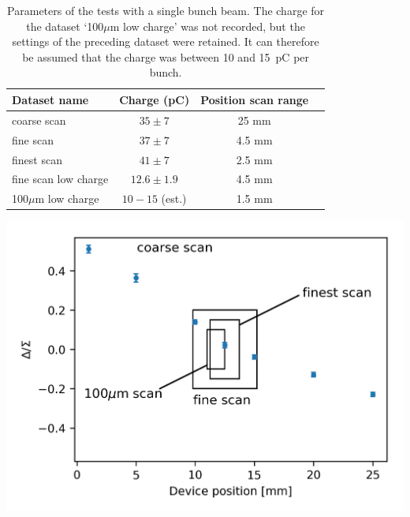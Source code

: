\begin{table}[!ht]
  \centering
    \begin{tabular}{l c c c}
    \toprule
    Dataset name & Charge (pC) & Position scan range  \\
    \midrule
    coarse scan  & $35\pm7$ & 25 mm\\
    fine scan    & $37\pm7$ & 4.5 mm\\
    finest scan  & $41\pm7$ & 2.5 mm\\
    fine scan low charge  & $12.6\pm1.9$ & 4.5 mm\\
    100$\mu$m low charge  & $10-15$ (est.) & 1.5 mm\\
    \bottomrule
    \end{tabular}
  \caption{Parameters of the tests with a single bunch beam. The charge for the dataset `100$\mu$m low charge' was not recorded, but the settings of the preceding dataset were retained. It can therefore be assumed that the charge was between 10 and 15~pC per bunch.} \label{tab:1bunch_test_param}
  
\vspace{-1mm}
\includegraphics[scale=0.9, keepaspectratio]{pictures/coarse_vs_the_others}
\vspace*{-2mm}
\label{fig:datasets_comparison_1b}


\end{table}

